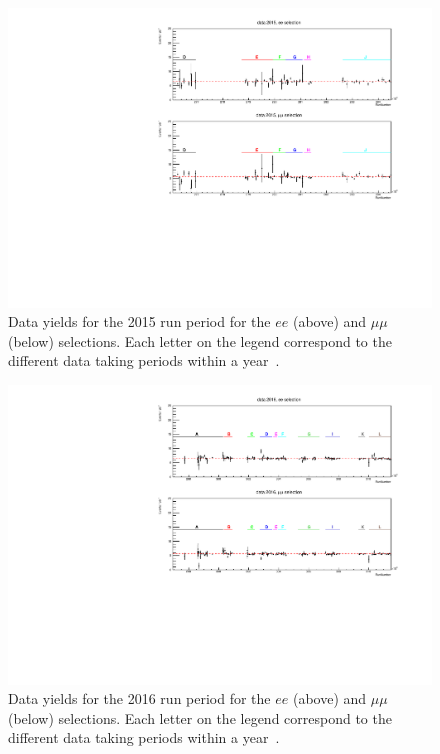 \begin{figure}[ht]
\centering
\includegraphics[width=\textwidth]{figures/analysis/datamc/Yields/compare_data_yields2015.pdf}
\caption[Data yields for the 2015 run period for the $ee$ (above) and $\mu\mu$ (below) selections.]{Data yields for the 2015 run period for the $ee$ (above) and $\mu\mu$ (below) selections. Each letter on the legend correspond to the different data taking periods within a year~\cite{Aad:2019fac}.}
\label{fig:yields2015}
\end{figure}

\begin{figure}[ht]
\centering
\includegraphics[width=\textwidth]{figures/analysis/datamc/Yields/compare_data_yields2016.pdf}
\caption[Data yields for the 2016 run period for the $ee$ (above) and $\mu\mu$ (below) selections.]{Data yields for the 2016 run period for the $ee$ (above) and $\mu\mu$ (below) selections. Each letter on the legend correspond to the different data taking periods within a year~\cite{Aad:2019fac}.}
\label{fig:yields2016}
\end{figure}

